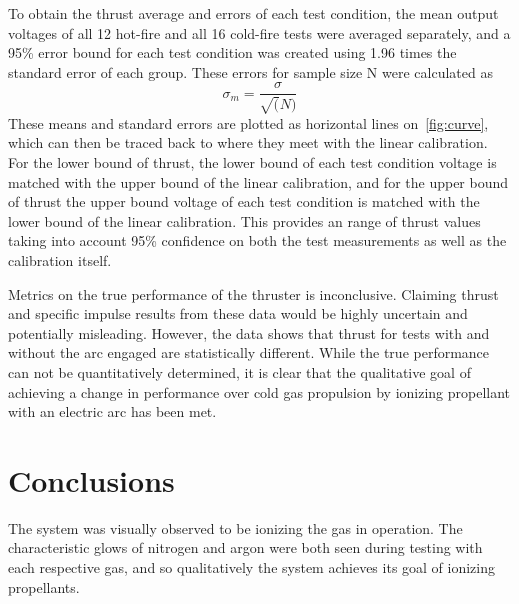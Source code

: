 \documentclass[journal]{IEEEtran}
\begin{document}
To obtain the thrust average and errors of each test condition, the mean output voltages of all 12 hot-fire and all 16 cold-fire tests were averaged separately, and a 95\% error bound for each test condition was created using 1.96 times the standard error of each group.
These errors for sample size N were calculated as
\begin{equation}
\label{eq:stderr}
  \sigma_m = \frac{\sigma}{\sqrt(N)}
\end{equation}
These means and standard errors are plotted as horizontal lines on~\autoref{fig:curve}, which can then be traced back to where they meet with the linear calibration.
For the lower bound of thrust, the lower bound of each test condition voltage is matched with the upper bound of the linear calibration, and for the upper bound of thrust the upper bound voltage of each test condition is matched with the lower bound of the linear calibration.
This provides an range of thrust values taking into account 95\% confidence on both the test measurements as well as the calibration itself.

Metrics on the true performance of the thruster is inconclusive.
Claiming thrust and specific impulse results from these data would be highly uncertain and potentially misleading.
However, the data shows that thrust for tests with and without the arc engaged are statistically different.
While the true performance can not be quantitatively determined, it is clear that the qualitative goal of achieving a change in performance over cold gas propulsion by ionizing propellant with an electric arc has been met.



\section{Conclusions}
The system was visually observed to be ionizing the gas in operation. The characteristic glows of nitrogen and argon were both seen during testing with each respective gas, and so qualitatively the system achieves its goal of ionizing propellants.
\end{document}
